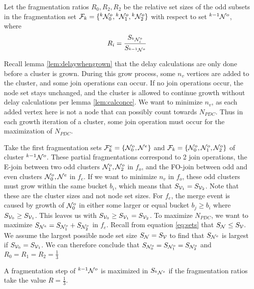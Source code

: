 \begin{lemma}\label{lem:fragratio}
  Let the fragmentation ratios $R_0, R_2, R_2$ be the relative set sizes of the odd subsets in the fragmentation set $\mathcal{F}_{k} = \{{}^{k}\mathcal{N}^o_0, {}^{k}\mathcal{N}^{o}_1, {}^{k}\mathcal{N}^{o}_2 \}$ with respect to set ${}^{k-1}\mathcal{N}^o$, where
  \begin{equation}\label{eq:fragratio}
    R_i = \frac{S_{{}^{k}\mathcal{N}^o_i}}{S_{{}^{k-1}\mathcal{N}^o}}
  \end{equation}
\end{lemma}

Recall lemma \ref{lem:delaywhengrown} that the delay calculations are only done before a cluster is grown. During this grow process, some $n_v$ vertices are added to the cluster, and some join operations can occur. If no join operations occur, the node set stays unchanged, and the cluster is allowed to continue growth without delay calculations per lemma \ref{lem:calconce}. We want to minimize $n_v$, as each added vertex here is not a node that can possibly count towards $N_{PDC}$. Thus in each growth iteration of a cluster, some join operation must occur for the maximization of $N_{PDC}$.

Take the first fragmentation sets $\mathcal{F}^e_{k} = \{\mathcal{N}^o_0, \mathcal{N}^{e} \}$ and $\mathcal{F}_{k} = \{\mathcal{N}^o_0, \mathcal{N}^{o}_1, \mathcal{N}^{o}_2 \}$ of cluster ${}^{k-1}\mathcal{N}^o$. These partial fragmentations correspond to 2 join operations, the E-join between two odd clusters $ \mathcal{N}^{o}_1, \mathcal{N}^{o}_2 $ in $f_o$, and the FO-join between odd and even clusters $\mathcal{N}^o_0, \mathcal{N}^{e} $ in $f_e$. If we want to minimize $n_v$ in $f_o$, these odd clusters must grow within the same bucket $b_i$, which means that $S_{\mathcal{V}_1} = S_{\mathcal{V}_2}$. Note that these are the cluster sizes and not node set sizes. For $f_e$, the merge event is caused by growth of $\mathcal{N}^o_0$ in either some larger or equal bucket $b_j \geq b_i$ where $ S_{\mathcal{V}_0} \geq S_{\mathcal{V}_1} $. This leaves us with $S_{\mathcal{V}_0} \geq S_{\mathcal{V}_1} = S_{\mathcal{V}_2}$. To maximize $N_{PDC}$, we want to maximize $S_{\mathcal{N}^e} = S_{\mathcal{N}^o_1} + S_{\mathcal{N}^o_2}$ in $f_e$. Recall from equation \ref{eq:sets} that $S_{\mathcal{N}} \leq S_{\mathcal{V}}$. We assume the largest possible node set size $S_{\mathcal{N}} = S_{\mathcal{V}}$ to find that $ S_{\mathcal{N}^e} $ is largest if $S_{\mathcal{V}_0} = S_{\mathcal{V}_1}$. We can therefore conclude that $S_{\mathcal{N}^o_0} = S_{\mathcal{N}^o_1} = S_{\mathcal{N}^o_2}$ and $R_0 = R_1 = R_2 = \frac{1}{3}$

\begin{lemma}\label{lem:thirdratio}
  A fragmentation step of ${}^{k-1}\mathcal{N}^o$ is maximized in $S_{{}^{k}\mathcal{N}^e}$ if the fragmentation ratios take the value $R = \frac{1}{3}$.
\end{lemma}

